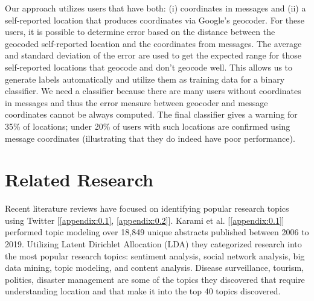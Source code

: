 Our approach utilizes users that have both: (i) coordinates in messages and (ii) a self-reported location that produces coordinates via Google's geocoder. For these users, it is possible to determine error based on the distance between the geocoded self-reported location and the coordinates from messages. The average and standard deviation of the error are used to get the expected range for those self-reported locations that geocode and don't geocode well. This allows us to generate labels automatically and utilize them as training data for a binary classifier. We need a classifier because there are many users without coordinates in messages and thus the error measure between geocoder and message coordinates cannot be always computed. The final classifier gives a warning for 35\% of locations; under 20\% of users with such locations are confirmed using message coordinates (illustrating that they do indeed have poor performance).



\section{Related Research}

Recent literature reviews have focused on identifying popular research topics using Twitter [\ref{appendix:0.1}, \ref{appendix:0.2}]. Karami et al. [\ref{appendix:0.1}] performed topic modeling over 18,849 unique abstracts published between 2006 to 2019. Utilizing Latent Dirichlet Allocation (LDA) they categorized research into the most popular research topics: sentiment analysis, social network analysis, big data mining, topic modeling, and content analysis. Disease surveillance, tourism, politics, disaster management are some of the topics they discovered that require understanding location and that make it into the top 40 topics discovered.

